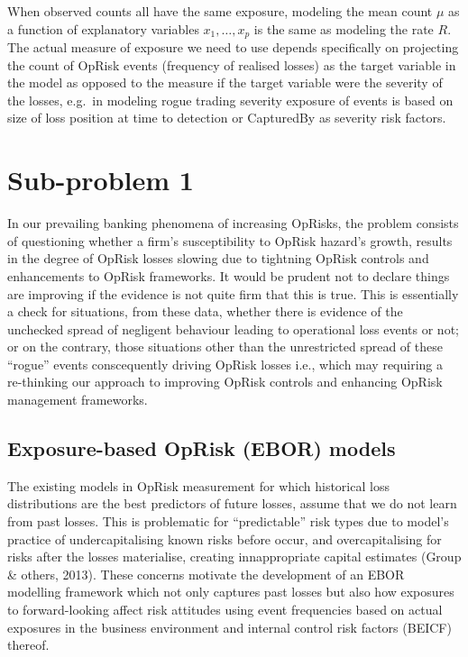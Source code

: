 \documentclass{DissertateUSU}
\begin{document}
When observed counts all have the same exposure, modeling the mean count
\(\mu\) as a function of explanatory variables \(x_{1},\ldots,x_{p}\) is
the same as modeling the rate \(R\). The actual measure of exposure we
need to use depends specifically on projecting the count of OpRisk
events (frequency of realised losses) as the target variable in the
model as opposed to the measure if the target variable were the severity
of the losses, e.g.~in modeling rogue trading severity exposure of
events is based on size of loss position at time to detection or
CapturedBy as severity risk factors.

\section{Sub-problem 1}
\label{sec:Sub-problem 1}

In our prevailing banking phenomena of increasing OpRisks, the problem
consists of questioning whether a firm's susceptibility to OpRisk
hazard's growth, results in the degree of OpRisk losses slowing due to
tightning OpRisk controls and enhancements to OpRisk frameworks. It
would be prudent not to declare things are improving if the evidence is
not quite firm that this is true. This is essentially a check for
situations, from these data, whether there is evidence of the unchecked
spread of negligent behaviour leading to operational loss events or not;
or on the contrary, those situations other than the unrestricted spread
of these ``rogue'' events conscequently driving OpRisk losses i.e.,
which may requiring a re-thinking our approach to improving OpRisk
controls and enhancing OpRisk management frameworks.

\subsection{Exposure-based OpRisk (EBOR) models}
\label{ssec:Exposure-based OpRisk (EBOR) models}

The existing models in OpRisk measurement for which historical loss
distributions are the best predictors of future losses, assume that we
do not learn from past losses. This is problematic for ``predictable''
risk types due to model's practice of undercapitalising known risks
before occur, and overcapitalising for risks after the losses
materialise, creating innappropriate capital estimates (Group \& others,
2013). These concerns motivate the development of an EBOR modelling
framework which not only captures past losses but also how exposures to
forward-looking affect risk attitudes using event frequencies based on
actual exposures in the business environment and internal control risk
factors (BEICF) thereof.
\end{document}

